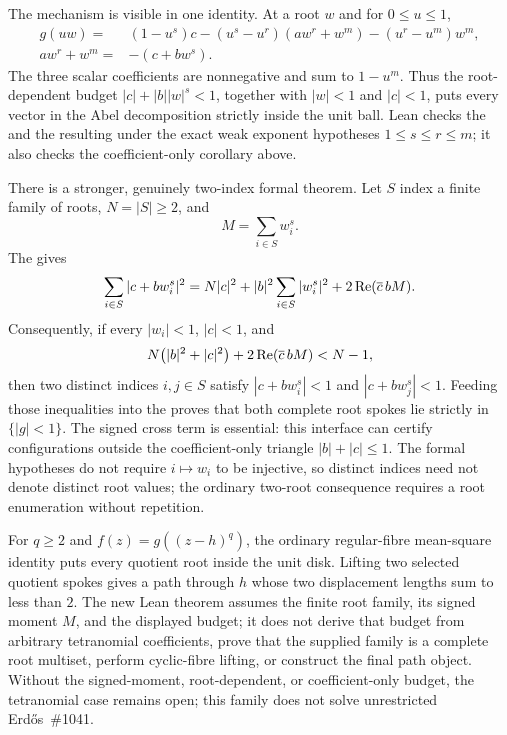 The mechanism is visible in one identity.  At a root $w$ and for
$0\le u\le1$,
\[
\begin{split}
 g(uw)={}&(1-u^s)c
  -(u^s-u^r)(aw^r+w^m)
  -(u^r-u^m)w^m,\\
 aw^r+w^m={}&-(c+bw^s).
\end{split}
\]
The three scalar coefficients are nonnegative and sum to $1-u^m$.  Thus the
root-dependent budget $|c|+|b||w|^s<1$, together with $|w|<1$ and $|c|<1$,
puts every vector in the Abel decomposition strictly inside the unit ball.
Lean checks the 
and the resulting  under
the exact weak exponent hypotheses $1\le s\le r\le m$; it also checks the
coefficient-only corollary above.

There is a stronger, genuinely two-index formal theorem.  Let $S$ index a
finite family of roots, $N=|S|\ge2$, and
\[
  M=\sum_{i\in S}w_i^s.
\]
The  gives
\[
 \sum_{i\in S}|c+bw_i^s|^2
 =N|c|^2+|b|^2\sum_{i\in S}|w_i^s|^2
   +2\mathop{\rm Re}(\overline c\,bM).
\]
Consequently, if every $|w_i|<1$, $|c|<1$, and
\[
 N\bigl(|b|^2+|c|^2\bigr)
   +2\mathop{\rm Re}(\overline c\,bM)<N-1,
\]
then two distinct indices $i,j\in S$ satisfy
$|c+bw_i^s|<1$ and $|c+bw_j^s|<1$.  Feeding those inequalities into the
 proves that both complete root spokes lie
strictly in $\{|g|<1\}$.  The signed cross term is essential: this interface
can certify configurations outside the coefficient-only triangle
$|b|+|c|\le1$.  The formal hypotheses do not require $i\mapsto w_i$ to be
injective, so distinct indices need not denote distinct root values; the
ordinary two-root consequence requires a root enumeration without repetition.

For $q\ge2$ and $f(z)=g((z-h)^q)$, the ordinary regular-fibre mean-square
identity puts every quotient root inside the unit disk.  Lifting two selected
quotient spokes gives a path through $h$ whose two displacement lengths sum
to less than $2$.  The new Lean theorem assumes the finite root family, its
signed moment $M$, and the displayed budget; it does not derive that budget
from arbitrary tetranomial coefficients, prove that the supplied family is a
complete root multiset, perform cyclic-fibre lifting, or construct the final
path object.  Without the signed-moment, root-dependent, or coefficient-only
budget, the tetranomial case remains open; this family does not solve
unrestricted Erd\H{o}s~\#1041.

